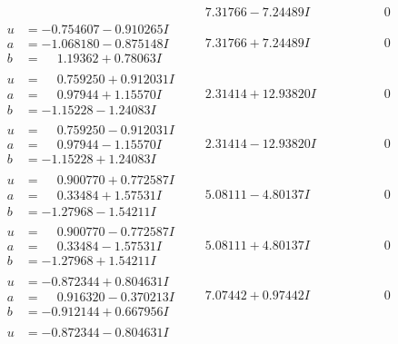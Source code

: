 \documentclass[1p]{elsarticle_modified}
\theoremstyle{definition}
\begin{document}
$$\begin{array}{c|c|c}
 & \phantom{-}7.31766 - 7.24489 I & \phantom{-0.000000 } 0 \\ \hline\begin{aligned}
u &= -0.754607 - 0.910265 I \\
a &= -1.068180 - 0.875148 I \\
b &= \phantom{-}1.19362 + 0.78063 I\end{aligned}
 & \phantom{-}7.31766 + 7.24489 I & \phantom{-0.000000 } 0 \\ \hline\begin{aligned}
u &= \phantom{-}0.759250 + 0.912031 I \\
a &= \phantom{-}0.97944 + 1.15570 I \\
b &= -1.15228 - 1.24083 I\end{aligned}
 & \phantom{-}2.31414 + 12.93820 I & \phantom{-0.000000 } 0 \\ \hline\begin{aligned}
u &= \phantom{-}0.759250 - 0.912031 I \\
a &= \phantom{-}0.97944 - 1.15570 I \\
b &= -1.15228 + 1.24083 I\end{aligned}
 & \phantom{-}2.31414 - 12.93820 I & \phantom{-0.000000 } 0 \\ \hline\begin{aligned}
u &= \phantom{-}0.900770 + 0.772587 I \\
a &= \phantom{-}0.33484 + 1.57531 I \\
b &= -1.27968 - 1.54211 I\end{aligned}
 & \phantom{-}5.08111 - 4.80137 I & \phantom{-0.000000 } 0 \\ \hline\begin{aligned}
u &= \phantom{-}0.900770 - 0.772587 I \\
a &= \phantom{-}0.33484 - 1.57531 I \\
b &= -1.27968 + 1.54211 I\end{aligned}
 & \phantom{-}5.08111 + 4.80137 I & \phantom{-0.000000 } 0 \\ \hline\begin{aligned}
u &= -0.872344 + 0.804631 I \\
a &= \phantom{-}0.916320 - 0.370213 I \\
b &= -0.912144 + 0.667956 I\end{aligned}
 & \phantom{-}7.07442 + 0.97442 I & \phantom{-0.000000 } 0 \\ \hline\begin{aligned}
u &= -0.872344 - 0.804631 I \\

\end{aligned}
\end{array}$$
\end{document}
